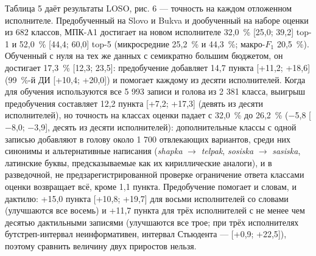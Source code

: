 \documentclass[a4paper,fleqn]{cas-dc}
\begin{document}
Таблица 5 даёт результаты LOSO, рис. 6 --- точность на каждом отложенном исполнителе. Предобученный на Slovo и Bukva и дообученный на наборе оценки из 682 классов, МПК-A1 достигает на новом исполнителе 32,0~\% {[}25,0; 39,2{]} top-1 и 52,0~\% {[}44,4; 60,0{]} top-5 (микросредние 25,2~\% и 44,3~\%; макро-\(F_1\) 20,5~\%). Обученный с нуля на тех же данных с семикратно большим бюджетом, он достигает 17,3~\% {[}12,3; 23,5{]}: предобучение добавляет 14,7 пункта {[}+11,2; +18,6{]} (99~\%-й ДИ {[}+10,4; +20,0{]}) и помогает каждому из десяти исполнителей. Когда для обучения используются все 5 993 записи и голова из 2 381 класса, выигрыш предобучения составляет 12,2 пункта {[}+7,2; +17,3{]} (девять из десяти исполнителей), но точность на классах оценки падает с 32,0~\% до 26,2~\% ($-$5,8 {[}$-$8,0; $-$3,9{]}, десять из десяти исполнителей): дополнительные классы с одной записью добавляют в голову около 1 700 отвлекающих вариантов, среди них синонимы и альтернативные написания (\emph{shapka} $\rightarrow$ \emph{telpak}, \emph{sosiska} $\rightarrow$ \emph{sasiska}, латинские буквы, предсказываемые как их кириллические аналоги), и в разведочной, не предзарегистрированной проверке ограничение ответа классами оценки возвращает всё, кроме 1,1 пункта. Предобучение помогает и словам, и дактилю: +15,0 пункта {[}+10,8; +19,7{]} для восьми исполнителей со словами (улучшаются все восемь) и +11,7 пункта для трёх исполнителей с не менее чем десятью дактильными записями (улучшаются все трое; при трёх исполнителях бутстреп-интервал неинформативен, интервал Стьюдента --- {[}+0,9; +22,5{]}), поэтому сравнить величину двух приростов нельзя.
\end{document}
